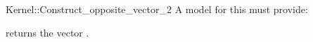\begin{ccRefFunctionObjectConcept}{Kernel::Construct_opposite_vector_2}
A model for this must provide:


{returns the vector .}

\end{ccRefFunctionObjectConcept}
